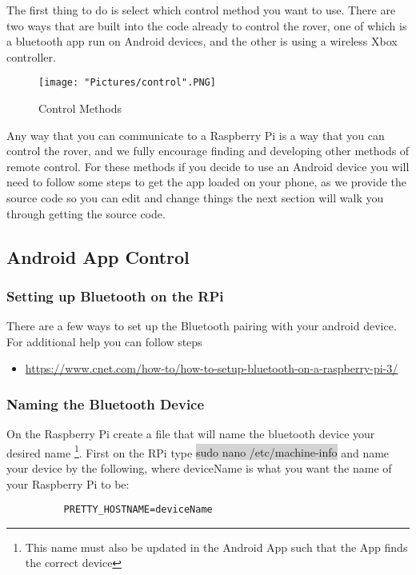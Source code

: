 \documentclass[12pt]{article}
\begin{document}
The first thing to do is select which control method you want to use. There are two ways that are built into the code already to control the rover, one of which is a bluetooth app run on Android devices, and the other is using a wireless Xbox controller. 

\begin{figure}[H]
 	\centering
	\texttt{[image: "Pictures/control".PNG]}
 	\caption{Control Methods}
	\label{controls}
\end{figure}

\noindent Any way that you can communicate to a Raspberry Pi is a way that you can control the rover, and we fully encourage finding and developing other methods of remote control. For these methods if you decide to use an Android device you will need to follow some steps to get the app loaded on your phone, as we provide the source code so you can edit and change things the next section will walk you through getting the source code.

\subsection{Android App Control}

\subsubsection{Setting up Bluetooth on the RPi}

There are a few ways to set up the Bluetooth pairing with your android device. For additional help you can follow steps  
\begin{itemize}
	\item \href{https://www.cnet.com/how-to/how-to-setup-bluetooth-on-a-raspberry-pi-3/}{https://www.cnet.com/how-to/how-to-setup-bluetooth-on-a-raspberry-pi-3/}
\end{itemize}
\subsubsection{Naming the Bluetooth Device}

On the Raspberry Pi create a file that will name the bluetooth device your desired name \footnote{This name must also be updated in the Android App such that the App finds the correct device}. First on the RPi type \colorbox{lightgray}{sudo nano /etc/machine-info} and name your device by the following, where deviceName is what you want the name of your Raspberry Pi to be:
\begin{verbatim}
          PRETTY_HOSTNAME=deviceName
\end{verbatim}
\end{document}
